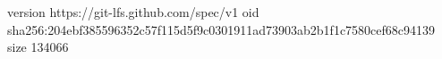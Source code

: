 version https://git-lfs.github.com/spec/v1
oid sha256:204ebf385596352c57f115d5f9c0301911ad73903ab2b1f1c7580cef68c94139
size 134066
